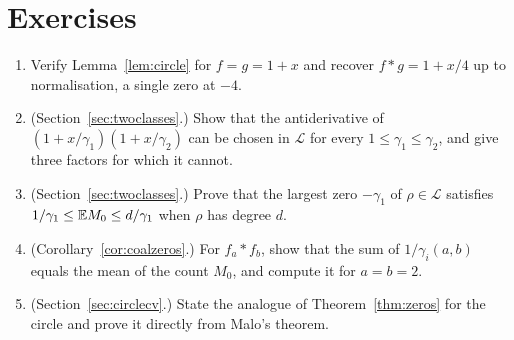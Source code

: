 \section*{Exercises}
\begin{enumerate}
\item Verify Lemma~\ref{lem:circle} for $f=g=1+x$ and recover $f*g=1+x/4$ up to normalisation, a single zero at $-4$.
\item (Section~\ref{sec:twoclasses}.) Show that the antiderivative of $(1+x/\gamma_1)(1+x/\gamma_2)$ can be chosen in $\mathcal L$ for every $1\le\gamma_1\le\gamma_2$, and give three factors for which it cannot.
\item (Section~\ref{sec:twoclasses}.) Prove that the largest zero $-\gamma_1$ of $\rho\in\mathcal L$ satisfies $1/\gamma_1\le\mathbb{E} M_0\le d/\gamma_1$ when $\rho$ has degree $d$.
\item (Corollary~\ref{cor:coalzeros}.) For $f_a*f_b$, show that the sum of $1/\gamma_i(a,b)$ equals the mean of the count $M_0$, and compute it for $a=b=2$.
\item (Section~\ref{sec:circlecv}.) State the analogue of Theorem~\ref{thm:zeros} for the circle and prove it directly from Malo's theorem.
\end{enumerate}
